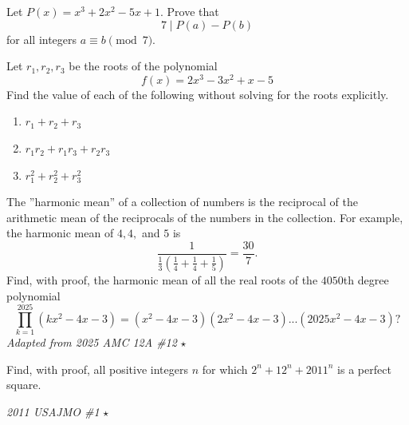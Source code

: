\begin{problem}
Let $P(x) = x^3 + 2x^2 - 5x + 1$. Prove that 
\[
7 \mid P(a) - P(b)
\]
for all integers $a \equiv b \pmod{7}$. 
\end{problem}

\begin{problem}
Let $r_1, r_2, r_3$ be the roots of the polynomial 
\[
f(x) = 2x^3 - 3x^2 + x - 5
\]
Find the value of each of the following without solving for the roots explicitly.
\begin{enumerate}[label=(\alph*)]
    \item $r_1 + r_2 + r_3$
    \item $r_1r_2 + r_1r_3 + r_2r_3$
    \item $r_1^2 + r_2^2 + r_3^2$
\end{enumerate}
\end{problem}

\begin{problem}
The ''harmonic mean'' of a collection of numbers is the reciprocal of the arithmetic mean of the reciprocals of the numbers in the collection. For example, the harmonic mean of $4,4,$ and $5$ is
\[\frac{1}{\frac{1}{3}(\frac{1}{4}+\frac{1}{4}+\frac{1}{5})}=\frac{30}{7}.\]
Find, with proof, the harmonic mean of all the real roots of the $4050$th degree polynomial
\[\prod_{k=1}^{2025} (kx^2-4x-3)=(x^2-4x-3)(2x^2-4x-3)...(2025x^2-4x-3)?\]
\hfill \textit{Adapted from 2025 AMC 12A \#12  }$\star$
\end{problem}

\begin{problem}
Find, with proof, all positive integers $n$ for which $2^n + 12^n + 2011^n$ is a perfect square. 

\hfill \textit{2011 USAJMO \#1  }$\star$
\end{problem}


